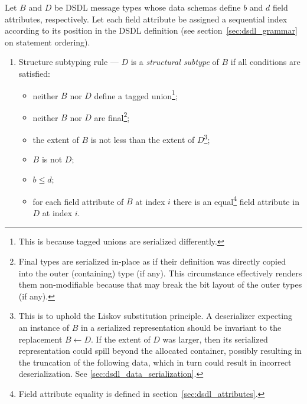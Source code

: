 Let $B$ and $D$ be DSDL message types whose data schemas define $b$ and $d$ field attributes, respectively.
Let each field attribute be assigned a sequential index according to its position in the DSDL definition
(see section~\ref{sec:dsdl_grammar} on statement ordering).

\begin{enumerate}
    \item Structure subtyping rule --- $D$ is a \emph{structural subtype} of $B$ if all conditions are satisfied:
    \begin{itemize}
        \item neither $B$ nor $D$ define a tagged union\footnote{%
            This is because tagged unions are serialized differently.
        };
        \item neither $B$ nor $D$ are final\footnote{%
            Final types are serialized in-place as if their definition was directly copied into the outer (containing)
            type (if any).
            This circumstance effectively renders them non-modifiable because that may break the bit layout of the outer
            types (if any).
        };
        \item the extent of $B$ is not less than the extent of $D$\footnote{%
            This is to uphold the Liskov substitution principle.
            A deserializer expecting an instance of $B$ in a serialized representation should be invariant
            to the replacement $B \leftarrow{} D$.
            If the extent of $D$ was larger, then its serialized representation could spill beyond the allocated
            container, possibly resulting in the truncation of the following data, which in turn could result in
            incorrect deserialization.
            See \ref{sec:dsdl_data_serialization}.
        };
        \item $B$ is not $D$;
        \item $b \leq d$;
        \item for each field attribute of $B$ at index $i$ there is an equal\footnote{%
                Field attribute equality is defined in section~\ref{sec:dsdl_attributes}.
            } field attribute in $D$ at index $i$.
    \end{itemize}


\end{enumerate}
